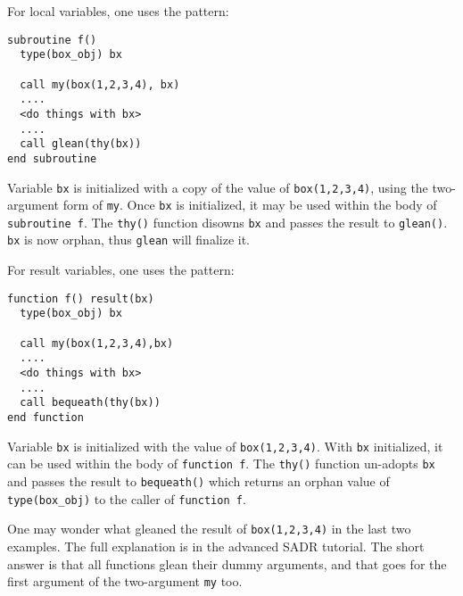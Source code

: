 For local variables, one uses the pattern:
\begin{verbatim}
subroutine f()
  type(box_obj) bx

  call my(box(1,2,3,4), bx)
  ....
  <do things with bx>
  ....
  call glean(thy(bx))
end subroutine
\end{verbatim}
Variable \verb+bx+ is initialized with a copy of the value 
of \verb+box(1,2,3,4)+, using the two-argument form of \verb+my+.
Once \verb+bx+ is
initialized, it may be used within the body of \verb+subroutine f+.
The \verb+thy()+ function disowns \verb+bx+ and passes the result
to \verb+glean()+.  \verb+bx+ is now orphan,
thus \verb+glean+ will finalize it.  

For result variables, one uses the pattern:
\begin{verbatim}
function f() result(bx)
  type(box_obj) bx

  call my(box(1,2,3,4),bx)
  ....
  <do things with bx>
  ....
  call bequeath(thy(bx))
end function
\end{verbatim}
Variable \verb+bx+ is initialized with
the value of \verb+box(1,2,3,4)+.   With \verb+bx+ 
initialized, it can be used within the body of \verb+function f+.
The \verb+thy()+ function un-adopts \verb+bx+
and passes the result to \verb+bequeath()+ which returns an
orphan value of \verb+type(box_obj)+ to the caller of 
\verb+function f+.

One may wonder what gleaned the result of \verb+box(1,2,3,4)+ in the
last two examples.  The full explanation is in the advanced SADR
tutorial.  The short answer is that all functions glean their dummy
arguments, and that goes for the first argument of the two-argument 
\verb+my+ too.

